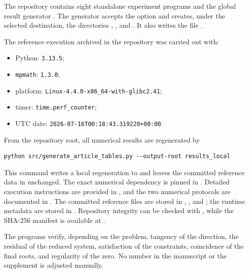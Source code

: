 \documentclass[11pt]{article}
\begin{document}
The repository contains eight standalone experiment programs and the global
result generator . The generator accepts
the option  and creates, under the selected destination,
the directories , , and
. It also writes the file
.

The reference execution archived in the repository was carried out with:
\begin{itemize}[nosep,leftmargin=*]
    \item Python: \texttt{3.13.5};
    \item \texttt{mpmath}: \texttt{1.3.0};
    \item platform: \nolinkurl{Linux-4.4.0-x86_64-with-glibc2.41};
    \item timer: \nolinkurl{time.perf_counter};
    \item UTC date: \nolinkurl{2026-07-16T00:18:43.319220+00:00}.
\end{itemize}

From the repository root, all numerical results are regenerated by
\begin{verbatim}
python src/generate_article_tables.py --output-root results_local
\end{verbatim}
This command writes a local regeneration to  and leaves
the committed reference data in  unchanged. The exact numerical
dependency is pinned in . Detailed execution instructions
are provided in , and the two numerical protocols
are documented in . The committed reference
files are stored in ,
, and ; the runtime
metadata are stored in . Repository
integrity can be checked with , while the
SHA-256 manifest is available at .

The programs verify, depending on the problem, tangency of the direction,
the residual of the reduced system, satisfaction of the constraints, coincidence
of the final roots, and regularity of the zero. No number in the manuscript or
the supplement is adjusted manually.
\endgroup
\end{document}

